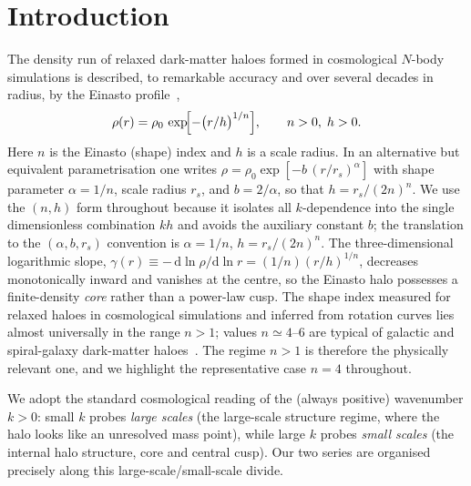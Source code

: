 \documentclass[aps,prd,onecolumn]{revtex4-2}
\begin{document}
\section{Introduction}

The density run of relaxed dark-matter haloes formed in cosmological
$N$-body simulations is described, to remarkable accuracy and over several
decades in radius, by the Einasto profile~\cite{Einasto1965,Navarro2004,
Merritt2006},
\begin{equation}
\rho(r)=\rho_0\,\exp\!\Bigl[-\bigl(r/h\bigr)^{1/n}\Bigr],
\qquad n>0,\;h>0 .
\label{eq:einasto}
\end{equation}
Here $n$ is the Einasto (shape) index and $h$ is a scale radius.  In an
alternative but equivalent parametrisation one writes
$\rho=\rho_0\exp[-b\,(r/r_s)^{\alpha}]$ with shape parameter
$\alpha=1/n$, scale radius $r_s$, and $b=2/\alpha$, so that
$h=r_s/(2n)^{n}$.  We use the $(n,h)$ form throughout because it isolates
all $k$-dependence into the single dimensionless combination $kh$ and
avoids the auxiliary constant $b$; the translation to the
$(\alpha,b,r_s)$ convention is $\alpha=1/n$, $h=r_s/(2n)^{n}$.
The three-dimensional logarithmic slope,
$\gamma(r)\equiv-\,\mathrm{d}\ln\rho/\mathrm{d}\ln r
=(1/n)(r/h)^{1/n}$, decreases monotonically inward and vanishes at the
centre, so the Einasto halo possesses a finite-density \emph{core} rather
than a power-law cusp.  The shape index measured for relaxed haloes in
cosmological simulations and inferred from rotation curves lies almost
universally in the range $n>1$; values $n\simeq4$--$6$ are typical of
galactic and spiral-galaxy dark-matter haloes~\cite{Navarro2004,Merritt2006}.
The regime $n>1$ is therefore the physically relevant one, and we
highlight the representative case $n=4$ throughout.

We adopt the standard cosmological reading of the (always positive)
wavenumber $k>0$: small $k$ probes \emph{large scales} (the large-scale
structure regime, where the halo looks like an unresolved mass point),
while large $k$ probes \emph{small scales} (the internal halo structure,
core and central cusp).  Our two series are organised precisely along this
large-scale/small-scale divide.
\end{document}
